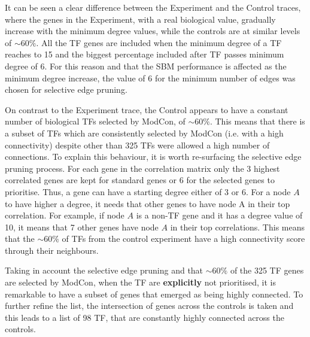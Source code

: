 It can be seen a clear difference between the Experiment and the Control traces, where the genes in the Experiment, with a real biological value, gradually increase with the minimum degree values, while the controls are at similar levels of $\sim60\%$. All the TF genes are included when the minimum degree of a TF reaches to 15 and the biggest percentage included after TF passes minimum degree of 6. For this reason and that the SBM performance is affected as the minimum degree increase, the value of 6 for the minimum number of edges was chosen for selective edge pruning.


On contrast to the Experiment trace, the Control appears to have a constant number of biological TFs selected by ModCon, of $\sim60\%$. This means that there is a subset of TFs which are consistently selected by ModCon (i.e. with a high connectivity) despite other than 325 TFs were allowed a high number of connections. To explain this behaviour, it is worth re-surfacing the selective edge pruning process. For each gene in the correlation matrix only the 3 highest correlated genes are kept for standard genes or 6 for the selected genes to prioritise. Thus, a gene can have a starting degree either of 3 or 6. For a node $A$ to have higher a degree, it needs that other genes to have node A in their top correlation. For example, if node $A$ is a non-TF gene and it has a degree value of 10, it means that 7 other genes have node $A$ in their top correlations. This means that the  $\sim60\%$ of TFs from the control experiment have a high connectivity score through their neighbours.

Taking in account the selective edge pruning and that $\sim60\%$ of the 325 TF genes are selected by ModCon, when the TF are \textbf{explicitly} not prioritised, it is remarkable to have a subset of genes that emerged as being highly connected. To further refine the list, the intersection of genes across the controls is taken and this leads to a list of 98 TF, that are constantly highly connected across the controls. 

